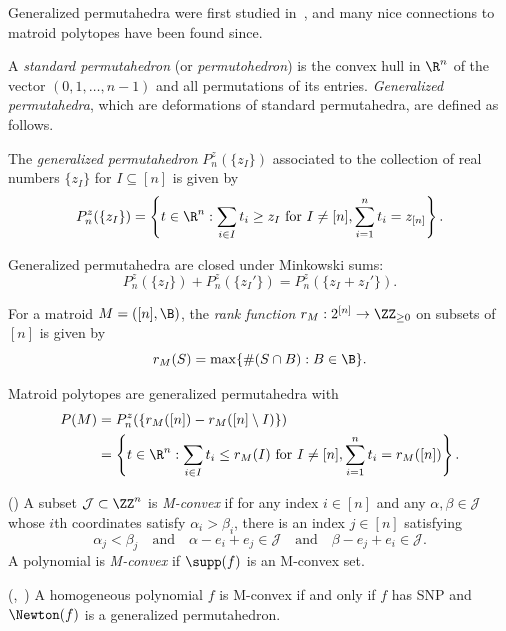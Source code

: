 Generalized permutahedra were first studied in~\cite{postnikovpermutohedra}, and many nice connections to matroid polytopes have been found since.

A \emph{standard permutahedron} (or \emph{permutohedron}) is the convex hull in $\R^n$ of the vector $(0, 1, \dots, n-1)$ and all permutations of its entries. \emph{Generalized permutahedra}, which are deformations of standard permutahedra, are defined as follows.

\begin{defi}
    The \emph{generalized permutahedron} $P_n^z(\{z_I\})$ associated to the collection of real numbers $\{z_I\}$ for $I\subseteq [n]$ is given by
    \[P_n^z(\{z_I\}) = \left\{t\in\R^n : \sum_{i\in I} t_i\ge z_I \text{ for } I\neq [n], \sum_{i=1}^n t_i = z_{[n]}\right\}.\]
\end{defi}

\begin{prop}\label{prop:permutahedraminkowskisum}
    Generalized permutahedra are closed under Minkowski sums:
    \[P_n^z(\{z_I\}) + P_n^z(\{z_I'\}) = P_n^z(\{z_I + z_I'\}).\]
\end{prop}

\begin{defi}\label{def:rankfunction}
    For a matroid $M = ([n], \B)$, the \emph{rank function} $r_M: 2^{[n]}\to\ZZ_{\ge 0}$ on subsets of $[n]$ is given by
    \[r_M(S) = \max\{\#(S\cap B) : B\in\B\}.\]
\end{defi}

\begin{prop}\label{prop:matroidsarepermutahedra}
    Matroid polytopes are generalized permutahedra with
    \begin{align*}
        P(M) &= P_n^z(\{r_M([n]) - r_M([n]\setminus I)\})\\
        &= \left\{t\in\R^n : \sum_{i\in I} t_i\le r_M(I) \text{ for } I\neq [n], \sum_{i=1}^n t_i = r_M([n])\right\}.
    \end{align*}
\end{prop}

\begin{defi}(\cite{DicreteConvexAnaly})
A subset $\mathcal{J} \subset \ZZ^n$ is \emph{M-convex} if for any index $i \in [n]$ and any $\alpha, \beta \in \mathcal{J}$ whose $i$th coordinates satisfy $\alpha_i > \beta_i$, there is an index $j \in [n]$ satisfying
\[
\alpha_j < \beta_j \quad \text{and} \quad \alpha - e_i + e_j \in \mathcal{J} \quad \text{and} \quad \beta - e_j + e_i \in \mathcal{J}.
\]
    A polynomial is \emph{M-convex} if $\supp(f)$ is an M-convex set.
\end{defi}
\begin{prop}\textup{(}\cite[Theorem 4.15]{DicreteConvexAnaly},~\cite{HuhMeszaroLorSchur}\textup{)}\label{prop:Mconvex=SNP+GP}
    A homogeneous polynomial $f$ is M-convex if and only if $f$ has SNP and $\Newton(f)$ is a generalized permutahedron.
\end{prop}




